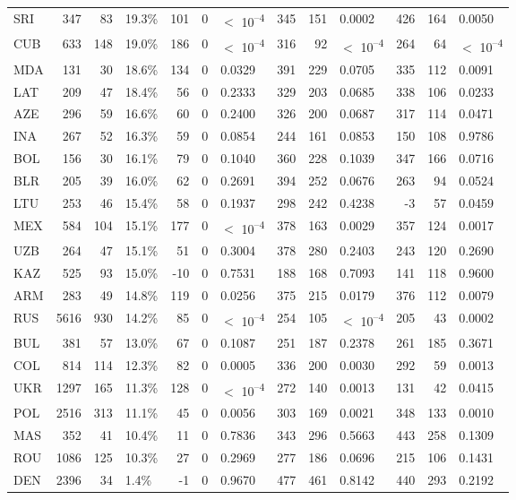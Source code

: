 \begin{tabular}[t]{lrrlrrlrrlrrl}
SRI & 347 & 83 & 19.3\% & 101 & 0 & $<$ 10\textsuperscript{--4} & 345 & 151 & 0.0002 & 426 & 164 & 0.0050\\
CUB & 633 & 148 & 19.0\% & 186 & 0 & $<$ 10\textsuperscript{--4} & 316 & 92 & $<$ 10\textsuperscript{--4} & 264 & 64 & $<$ 10\textsuperscript{--4}\\
MDA & 131 & 30 & 18.6\% & 134 & 0 & 0.0329 & 391 & 229 & 0.0705 & 335 & 112 & 0.0091\\
LAT & 209 & 47 & 18.4\% & 56 & 0 & 0.2333 & 329 & 203 & 0.0685 & 338 & 106 & 0.0233\\
AZE & 296 & 59 & 16.6\% & 60 & 0 & 0.2400 & 326 & 200 & 0.0687 & 317 & 114 & 0.0471\\
INA & 267 & 52 & 16.3\% & 59 & 0 & 0.0854 & 244 & 161 & 0.0853 & 150 & 108 & 0.9786\\
BOL & 156 & 30 & 16.1\% & 79 & 0 & 0.1040 & 360 & 228 & 0.1039 & 347 & 166 & 0.0716\\
BLR & 205 & 39 & 16.0\% & 62 & 0 & 0.2691 & 394 & 252 & 0.0676 & 263 & 94 & 0.0524\\
LTU & 253 & 46 & 15.4\% & 58 & 0 & 0.1937 & 298 & 242 & 0.4238 & -3 & 57 & 0.0459\\
MEX & 584 & 104 & 15.1\% & 177 & 0 & $<$ 10\textsuperscript{--4} & 378 & 163 & 0.0029 & 357 & 124 & 0.0017\\
UZB & 264 & 47 & 15.1\% & 51 & 0 & 0.3004 & 378 & 280 & 0.2403 & 243 & 120 & 0.2690\\
KAZ & 525 & 93 & 15.0\% & -10 & 0 & 0.7531 & 188 & 168 & 0.7093 & 141 & 118 & 0.9600\\
ARM & 283 & 49 & 14.8\% & 119 & 0 & 0.0256 & 375 & 215 & 0.0179 & 376 & 112 & 0.0079\\
RUS & 5616 & 930 & 14.2\% & 85 & 0 & $<$ 10\textsuperscript{--4} & 254 & 105 & $<$ 10\textsuperscript{--4} & 205 & 43 & 0.0002\\
BUL & 381 & 57 & 13.0\% & 67 & 0 & 0.1087 & 251 & 187 & 0.2378 & 261 & 185 & 0.3671\\
COL & 814 & 114 & 12.3\% & 82 & 0 & 0.0005 & 336 & 200 & 0.0030 & 292 & 59 & 0.0013\\
UKR & 1297 & 165 & 11.3\% & 128 & 0 & $<$ 10\textsuperscript{--4} & 272 & 140 & 0.0013 & 131 & 42 & 0.0415\\
POL & 2516 & 313 & 11.1\% & 45 & 0 & 0.0056 & 303 & 169 & 0.0021 & 348 & 133 & 0.0010\\
MAS & 352 & 41 & 10.4\% & 11 & 0 & 0.7836 & 343 & 296 & 0.5663 & 443 & 258 & 0.1309\\
ROU & 1086 & 125 & 10.3\% & 27 & 0 & 0.2969 & 277 & 186 & 0.0696 & 215 & 106 & 0.1431\\
DEN & 2396 & 34 & 1.4\% & -1 & 0 & 0.9670 & 477 & 461 & 0.8142 & 440 & 293 & 0.2192\\
\bottomrule
\end{tabular}
